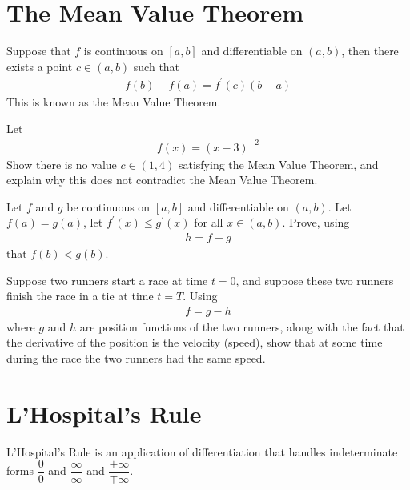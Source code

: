 \newpage
\section{The Mean Value Theorem}

\begin{theorem}
Suppose that $f$ is continuous on $[a, b]$ and differentiable on $(a, b)$, then there exists a point $c \in (a, b)$ such that
\begin{align*}
    f(b) - f(a) = f^{'}(c)(b - a)
\end{align*}
This is known as the Mean Value Theorem.
\end{theorem}

\begin{exercise}
Let 
\begin{align*}
    f(x) = (x-3)^{-2}
\end{align*}
Show there is no value $c \in (1,4)$ satisfying the Mean Value Theorem, and explain why this does not contradict the Mean Value Theorem. 
\end{exercise}

\begin{exercise}
Let $f$ and $g$ be continuous on $[a, b]$ and differentiable on $(a, b)$. Let $f(a) = g(a)$, let $f^{'}(x) \leq g^{'}(x)$ for all $x \in (a, b)$. Prove, using
\begin{align*}
    h = f - g
\end{align*}
that $f(b) < g(b)$.
\end{exercise}

\begin{exercise}
Suppose two runners start a race at time $t = 0$, and suppose these two runners finish the race in a tie at time $t = T$. Using
\begin{align*}
    f = g - h
\end{align*}
where $g$ and $h$ are position functions of the two runners, along with the fact that the derivative of the position is the velocity (speed), show that at some time during the race the two runners had the same speed.
\end{exercise}

\newpage
\section{L'Hospital's Rule}

L'Hospital's Rule is an application of differentiation that handles indeterminate forms $\dfrac{0}{0}$ and $\dfrac{\infty}{\infty}$ and $\dfrac{\pm \infty}{\mp \infty}$.

